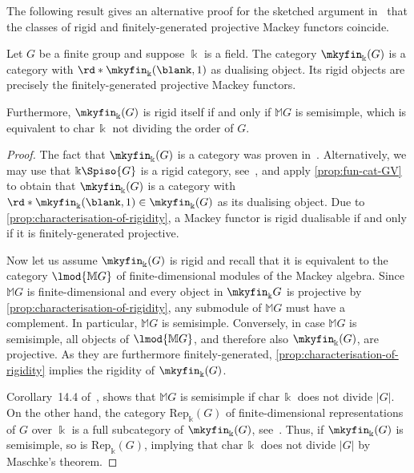 The following result gives an alternative proof for the sketched argument
in~\cite[Lemma~2.2]{bouc05:mackey}
that the classes of rigid and finitely\hyp{}generated projective Mackey functors coincide.

\begin{proposition}\label{prop:mky-GV-and-rigid}
  Let \(G\) be a finite group and suppose \(\Bbbk\) is a field.
  The category \(\mkyfin_\Bbbk(G)\) is a \GV{} category with \(\rd*{\mkyfin_\Bbbk( \blank,1)}\) as dualising object.
  Its rigid objects are precisely the finitely\hyp{}generated projective Mackey functors.

  Furthermore, \(\mkyfin_{\Bbbk}(G)\) is rigid itself if and only if \(\mathbb{M}G\) is semisimple,
  which is equivalent to \(\mathrm{char}\,\Bbbk\) not dividing the order of \(G\).
\end{proposition}
\begin{proof}
  The fact that \(\mkyfin_{\Bbbk}(G)\) is a \GV{} category was proven in~\cite[Theorem~9.2]{panchadcharam07:mackey}.
  Alternatively, we may use that \(\Bbbk\Spiso{G}\) is a rigid category,
  see~\cite[Section~2]{panchadcharam07:mackey},
  and apply
  \cref{prop:fun-cat-GV} to obtain that \(\mkyfin_{\Bbbk}(G)\)
  is a \GV{} category with \(\rd*{\mkyfin_\Bbbk(\blank,1)}\in \mkyfin_{\Bbbk}(G)\) as its dualising object.
  Due to \cref{prop:characterisation-of-rigidity},
  a Mackey functor is rigid dualisable if and only if it is finitely\hyp{}generated projective.

  Now let us assume \(\mkyfin_{\Bbbk}(G)\) is rigid and recall that it is equivalent to the category \(\lmod{\mathbb{M}G}\) of finite\hyp{}dimensional modules of the Mackey algebra.
  Since \(\mathbb{M}G\) is finite\hyp{}dimensional and every object in \(\mkyfin_{\Bbbk}G\) is projective by \cref{prop:characterisation-of-rigidity}, any submodule of \(\mathbb{M}G\) must have a complement.
  In particular, \(\mathbb{M}G\) is semisimple.
  Conversely, in case \(\mathbb{M}G\) is semisimple, all objects of \(\lmod{\mathbb{M}G}\), and therefore also \(\mkyfin_{\Bbbk}(G)\), are projective.
  As they are furthermore finitely\hyp{}generated, \cref{prop:characterisation-of-rigidity} implies the rigidity of \(\mkyfin_{\Bbbk}(G)\).

  Corollary~14.4 of~\cite{thevenaz95:mackey}, shows that \(\mathbb{M}G\) is semisimple if \(\mathrm{char}\,\Bbbk\) does not divide \(|G|\).
  On the other hand, the category \(\mathrm{Rep}_{\Bbbk}(G)\) of finite\hyp{}dimensional representations of \(G\) over \(\Bbbk\) is a full subcategory of \(\mkyfin_{\Bbbk}(G)\), see~\cite[Proposition~10.1]{panchadcharam07:mackey}.
  Thus, if \(\mkyfin_{\Bbbk}(G)\) is semisimple, so is \(\mathrm{Rep}_{\Bbbk}(G)\),
  implying that \(\mathrm{char}\,\Bbbk\) does not divide \(|G|\)
  by Maschke's theorem.
\end{proof}

